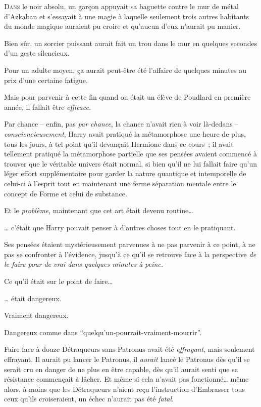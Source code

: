 

\lettrine{D}{ans}  le noir absolu, un garçon appuyait sa baguette contre le mur de métal d'Azkaban et s'essayait à une magie à laquelle seulement trois autres habitants du monde magique auraient pu croire et qu'aucun d'eux n'aurait pu manier.

Bien sûr, un sorcier puissant aurait fait un trou dans le mur en quelques secondes d'un geste silencieux.

Pour un adulte moyen, ça aurait peut-être été l'affaire de quelques minutes au prix d'une certaine fatigue.

Mais pour parvenir à cette fin quand on était un élève de Poudlard en première année, il fallait être \emph{efficace}.

Par chance -- enfin, pas \emph{par chance}, la chance n'avait rien à voir là-dedans -- \emdashhyp\emph{consciencieusement}, Harry avait pratiqué la métamorphose une heure de plus, tous les jours, à tel point qu'il devançait Hermione dans ce cours~; il avait tellement pratiqué la métamorphose partielle que ses pensées avaient commencé à trouver que le véritable univers était normal, si bien qu'il ne lui fallait faire qu'un léger effort supplémentaire pour garder la nature quantique et intemporelle de celui-ci à l'esprit tout en maintenant une ferme séparation mentale entre le concept de Forme et celui de substance.

Et le \emph{problème}, maintenant que cet art était devenu routine…

… c'était que Harry pouvait penser à d'autres choses tout en le pratiquant.

Ses pensées étaient mystérieusement parvenues à ne pas parvenir à ce point, à ne pas se confronter à l'évidence, jusqu'à ce qu'il se retrouve face à la perspective \emph{de le faire pour de vrai dans quelques minutes à peine.}

Ce qu'il était sur le point de faire…

… était dangereux.

Vraiment dangereux.

Dangereux comme dans “quelqu'un-pourrait-vraiment-mourrir”.

Faire face à douze Détraqueurs sans Patronus avait été \emph{effrayant}, mais seulement effrayant. Il aurait pu lancer le Patronus, il \emph{aurait} lancé le Patronus dès qu'il se serait cru en danger de ne plus en être capable, dès qu'il aurait senti que sa résistance commençait à lâcher. Et même si cela n'avait pas fonctionné… même alors, à moins que les Détraqueurs n'aient reçu l'instruction d'Embrasser tous ceux qu'ils croiseraient, un échec n'aurait pas été \emph{fatal}.

